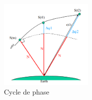 \documentclass[xcolor=dvipsnames,envcountsect]{beamer}
\begin{document}
\begin{frame}
\begin{columns}
\begin{column}{0.5\textwidth}
			\begin{figure}
				\centering
				\includegraphics[width=0.4\textwidth]{./Figures/phase.png}
				\caption {Cycle de phase \cite{ens}}
			\end{figure}
		\end{column}
	\end{columns}
\end{frame}
\end{document}

